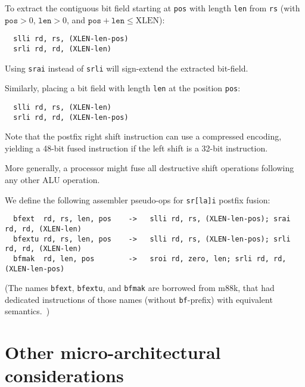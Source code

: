 To extract the contiguous bit field starting at {\tt pos} with length {\tt len}
from {\tt rs} (with $\texttt{pos}>0$, $\texttt{len}>0$, and
$\texttt{pos}+\texttt{len}\le\textrm{XLEN}$):

\begin{minipage}{\linewidth}
\begin{verbatim}
  slli rd, rs, (XLEN-len-pos)
  srli rd, rd, (XLEN-len)
\end{verbatim}
\end{minipage}

Using \texttt{srai} instead of \texttt{srli} will sign-extend the extracted bit-field.

Similarly, placing a bit field with length {\tt len} at the position {\tt pos}:

\begin{minipage}{\linewidth}
\begin{verbatim}
  slli rd, rs, (XLEN-len)
  srli rd, rd, (XLEN-len-pos)
\end{verbatim}
\end{minipage}

Note that the postfix right shift instruction can use a compressed encoding,
yielding a 48-bit fused instruction if the left shift is a 32-bit instruction.

More generally, a processor might fuse all destructive shift operations following
any other ALU operation.

We define the following assembler pseudo-ops for {\tt sr[la]i} postfix fusion:

\begin{minipage}{\linewidth}
\begin{verbatim}
  bfext  rd, rs, len, pos    ->   slli rd, rs, (XLEN-len-pos); srai rd, rd, (XLEN-len)
  bfextu rd, rs, len, pos    ->   slli rd, rs, (XLEN-len-pos); srli rd, rd, (XLEN-len)
  bfmak  rd, len, pos        ->   sroi rd, zero, len; srli rd, rd, (XLEN-len-pos)
\end{verbatim}
\end{minipage}

(The names {\tt bfext}, {\tt bfextu}, and {\tt bfmak} are borrowed from m88k,
that had dedicated instructions of those names (without {\tt bf}-prefix) with
equivalent semantics.~\cite[p.~3-28]{m88k})


\section{Other micro-architectural considerations}


